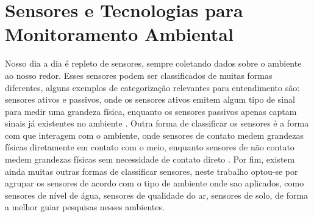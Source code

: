\documentclass[conference]{IEEEtran}
\begin{document}


\section{Sensores e Tecnologias para Monitoramento Ambiental} \label{cap:sensors}

Nosso dia a dia é repleto de sensores, sempre coletando dados sobre o ambiente ao nosso redor. Esses sensores podem ser classificados de muitas formas diferentes, alguns exemplos de categorização relevantes para entendimento são: sensores ativos e passivos, onde os sensores ativos emitem algum tipo de sinal para medir uma grandeza física, enquanto os sensores passivos apenas captam sinais já existentes no ambiente \cite{javaid_2021_sensors}. Outra forma de classificar os sensores é a forma com que interagem com o ambiente, onde sensores de contato medem grandezas físicas diretamente em contato com o meio, enquanto sensores de não contato medem grandezas físicas sem necessidade de contato direto \cite{javaid_2021_sensors, mohindru_2023_development, wu_2023_a}. Por fim, existem ainda muitas outras formas de classificar sensores, neste trabalho optou-se por agrupar os sensores de acordo com o tipo de ambiente onde sao aplicados, como sensores de nível de água, sensores de qualidade do ar, sensores de solo, de forma a melhor guiar pesquisas nesses ambientes. 
\end{document}
